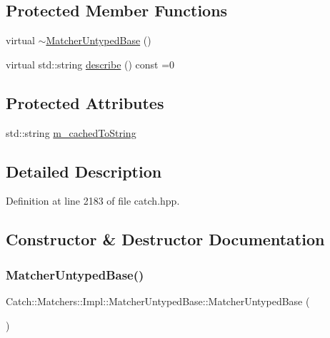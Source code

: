 \subsection*{Protected Member Functions}
\begin{DoxyCompactItemize}
\item 
virtual \mbox{\hyperlink{class_catch_1_1_matchers_1_1_impl_1_1_matcher_untyped_base_a853be93ce33f71b5abede38081c79e9d}{$\sim$\+Matcher\+Untyped\+Base}} ()
\item 
virtual std\+::string \mbox{\hyperlink{class_catch_1_1_matchers_1_1_impl_1_1_matcher_untyped_base_a91d3a907dbfcbb596077df24f6e11fe2}{describe}} () const =0
\end{DoxyCompactItemize}
\subsection*{Protected Attributes}
\begin{DoxyCompactItemize}
\item 
std\+::string \mbox{\hyperlink{class_catch_1_1_matchers_1_1_impl_1_1_matcher_untyped_base_a951095c462657e7097a9a6dc4dde813f}{m\+\_\+cached\+To\+String}}
\end{DoxyCompactItemize}


\subsection{Detailed Description}


Definition at line 2183 of file catch.\+hpp.



\subsection{Constructor \& Destructor Documentation}
\mbox{\label{class_catch_1_1_matchers_1_1_impl_1_1_matcher_untyped_base_ab65764dc245d85e2b268d3be870b650a}} 
\subsubsection{\texorpdfstring{Matcher\+Untyped\+Base()}{MatcherUntypedBase()}\hspace{0.1cm}{\footnotesize\ttfamily [1/2]}}
{\footnotesize\ttfamily Catch\+::\+Matchers\+::\+Impl\+::\+Matcher\+Untyped\+Base\+::\+Matcher\+Untyped\+Base (\begin{DoxyParamCaption}{ }\end{DoxyParamCaption})\hspace{0.3cm}{\ttfamily [default]}}

